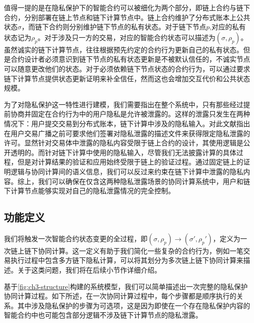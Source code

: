 值得一提的是在隐私保护下的智能合约可以被细化为两个部分，即链上合约与链下合约，分别部署在链上节点和链下计算节点中。链上合约维护了分布式账本上公共状态$\sigma$，而链下合约则分别维护链下节点的私有状态。对于链下节点$\mathit{p}$,对应的私有状态记为$\rho_\mathit{p}$。对于涉及只一方的交易，对应的智能合约状态可以描述为$(\sigma, \rho_\mathit{p})$。虽然诚实的链下计算节点，往往根据预先约定的合约行为更新自己的私有状态。但是合约设计者必须意识到链下节点的私有状态更新是不被默认信任的，不诚实节点可以随意更改他们的状态。对于必须依赖链下节点状态的合约行为，可以通过要求链下计算节点提供状态更新证明来补全信任，然而这也会增加交互代价和公共状态规模\cite{9505181}。

为了对隐私保护这一特性进行建模，我们需要指出在整个系统中，只有那些经过提前协商并固定在合约行为中的用户隐私是允许被泄露的。这样的泄露只发生在两种情况下：用户提交交易到分布式账本，链下计算中涉及的隐私输入。对此文献\cite{9505181}指出在用户交易广播之前可要求他们签署对隐私泄露的描述文件来获得限定隐私泄露的许可。显然针对交易体中泄露的隐私内容受限于链上合约的设计，其使用逻辑是公开透明的。而针对链下计算中使用的隐私输入，尽管我们无法披露计算的具体过程，但是对计算结果的验证和应用始终受限于链上的验证过程。通过固定链上的证明逻辑与协同计算间的语义信息，我们可以反过来约束在链下计算中泄露的隐私内容。综上，我们可以确保在仅含这两种隐私泄露场景的协同计算系统中，用户和链下计算节点能够实现对自己的隐私泄露情况的完全控制。
\subsection{功能定义}
我们将触发一次智能合约状态变更的全过程，即$(\sigma, \rho_\mathit{p})\rightarrow(\sigma', \rho_\mathit{p}')$，定义为一次链上链下协同计算。这一定义有助于我们简化一些复杂的合约行为，例如一笔交易执行过程中包含多方链下隐私计算，可以将其划分为多次链上链下协同计算来描述。关于这类问题，我们将在后续小节作详细介绍。

基于\autoref{fig:ch3-structure}构建的系统模型，我们可以简单描述出一次完整的隐私保护协同计算过程。如下所述，在一次协同计算过程中，每个步骤都是顺序执行的关系。其中涉及隐私保护的步骤为可选项，这是因为即使在一个存在隐私保护内容的智能合约中也可能包含部分逻辑不涉及链下计算节点的隐私泄露。

